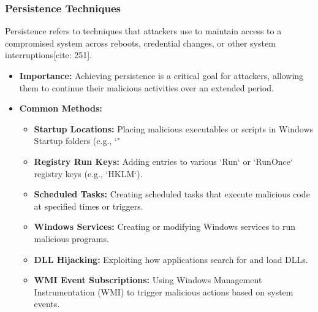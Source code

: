 \documentclass[11pt]{article}
\begin{document}
	\subsubsection{Persistence Techniques}
	Persistence refers to techniques that attackers use to maintain access to a compromised system across reboots, credential changes, or other system interruptions[cite: 251].
	\begin{itemize}
		\item \textbf{Importance:} Achieving persistence is a critical goal for attackers, allowing them to continue their malicious activities over an extended period.
		\item \textbf{Common Methods:}
		\begin{itemize}
			\item \textbf{Startup Locations:} Placing malicious executables or scripts in Windows Startup folders (e.g., `"%
			\item \textbf{Registry Run Keys:} Adding entries to various `Run` or `RunOnce` registry keys (e.g., `HKLM\Software\Microsoft\Windows\CurrentVersion\Run`).
			\item \textbf{Scheduled Tasks:} Creating scheduled tasks that execute malicious code at specified times or triggers.
			\item \textbf{Windows Services:} Creating or modifying Windows services to run malicious programs.
			\item \textbf{DLL Hijacking:} Exploiting how applications search for and load DLLs.
			\item \textbf{WMI Event Subscriptions:} Using Windows Management Instrumentation (WMI) to trigger malicious actions based on system events.
		\end{itemize}
	\end{itemize}
	
\end{document}
